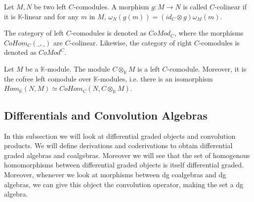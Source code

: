 \documentclass[../thesis.tex]{subfiles}
\begin{document}
\begin{definition}[Comodules]
\begin{center}
                \end{center}
            \end{definition}

            \begin{definition}
                Let $M,N$ be two left $C$-comodules. A morphism $g:M\rightarrow N$ is called $C$-colinear if it is $\mathbb{K}$-linear and for any $m$ in $M$, $\omega_N(g(m)) = (id_C\otimes g)\omega_M(m)$.
            \end{definition}

            The category of left $C$-comodules is denoted as $CoMod_C$, where the morphisms $CoHom_C(\_,\_)$ are $C$-colinear. Likewise, the category of right $C$-comodules is denoted as $CoMod^C$.

            \begin{proposition}
                Let $M$ be a $\mathbb{K}$-module. The module $C\otimes_{\mathbb{K}}M$ is a left $C$-comodule. Moreover, it is the cofree left comodule over $\mathbb{K}$-modules, i.e. there is an isomorphism $Hom_{\mathbb{K}}(N,M)\simeq CoHom_C(N,C\otimes_{\mathbb{K}}M)$. 
            \end{proposition}

        \subsection{Differentials and Convolution Algebras}
            In this subsection we will look at differential graded objects and convolution products. We will define derivations and coderivations to obtain differential graded algebras and coalgebras. Moreover we will see that the set of homogenous homomorphisms between differential graded objects is itself differential graded. Moreover, whenever we look at morphisms between dg coalgebras and dg algebras, we can give this object the convolution operator, making the set a dg algebra.
\end{document}
